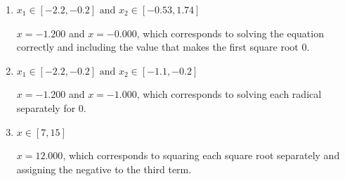 \documentclass{extbook}[14pt]
\begin{document}
\begin{enumerate}
{\begin{enumerate}[label=\Alph*.]
This corresponds to believing the solution $x = -0.000$ leads to a complex value in the original equation.
\item \( x_1 \in [-2.2, -0.2] \text{ and } x_2 \in [-0.53,1.74] \)

$x = -1.200$ and $x = -0.000$, which corresponds to solving the equation correctly and including the value that makes the first square root 0.
\item \( x_1 \in [-2.2, -0.2] \text{ and } x_2 \in [-1.1,-0.2] \)

$x = -1.200$ and $x = -1.000$, which corresponds to solving each radical separately for 0.
\item \( x \in [7,15] \)

$x = 12.000$, which corresponds to squaring each square root separately and assigning the negative to the third term.
\end{enumerate}

}
\end{enumerate}
\end{document}
